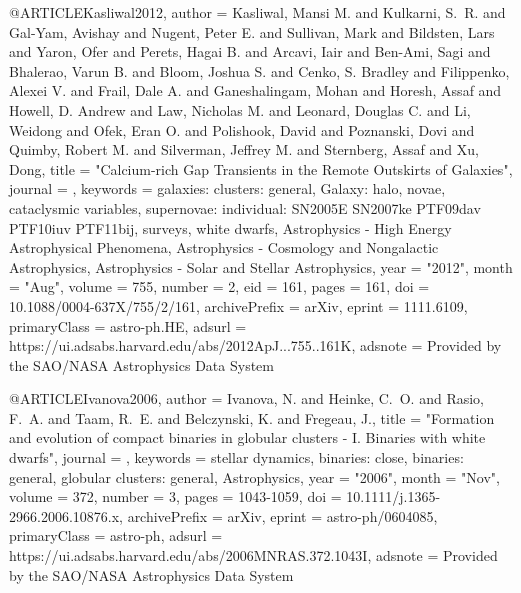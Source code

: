\documentclass[twocolumn,tighten]{aastex63}
\begin{document}
{@ARTICLE{Kasliwal2012,
       author = {{Kasliwal}, Mansi M. and {Kulkarni}, S.~R. and {Gal-Yam}, Avishay and
         {Nugent}, Peter E. and {Sullivan}, Mark and {Bildsten}, Lars and
         {Yaron}, Ofer and {Perets}, Hagai B. and {Arcavi}, Iair and
         {Ben-Ami}, Sagi and {Bhalerao}, Varun B. and {Bloom}, Joshua S. and
         {Cenko}, S. Bradley and {Filippenko}, Alexei V. and {Frail}, Dale A. and
         {Ganeshalingam}, Mohan and {Horesh}, Assaf and {Howell}, D. Andrew and
         {Law}, Nicholas M. and {Leonard}, Douglas C. and {Li}, Weidong and
         {Ofek}, Eran O. and {Polishook}, David and {Poznanski}, Dovi and
         {Quimby}, Robert M. and {Silverman}, Jeffrey M. and {Sternberg}, Assaf and
         {Xu}, Dong},
        title = "{Calcium-rich Gap Transients in the Remote Outskirts of Galaxies}",
      journal = {\apj},
     keywords = {galaxies: clusters: general, Galaxy: halo, novae, cataclysmic variables, supernovae: individual: SN2005E SN2007ke PTF09dav PTF10iuv PTF11bij, surveys, white dwarfs, Astrophysics - High Energy Astrophysical Phenomena, Astrophysics - Cosmology and Nongalactic Astrophysics, Astrophysics - Solar and Stellar Astrophysics},
         year = "2012",
        month = "Aug",
       volume = {755},
       number = {2},
          eid = {161},
        pages = {161},
          doi = {10.1088/0004-637X/755/2/161},
archivePrefix = {arXiv},
       eprint = {1111.6109},
 primaryClass = {astro-ph.HE},
       adsurl = {https://ui.adsabs.harvard.edu/abs/2012ApJ...755..161K},
      adsnote = {Provided by the SAO/NASA Astrophysics Data System}
}

@ARTICLE{Ivanova2006,
       author = {{Ivanova}, N. and {Heinke}, C.~O. and {Rasio}, F.~A. and {Taam}, R.~E. and
         {Belczynski}, K. and {Fregeau}, J.},
        title = "{Formation and evolution of compact binaries in globular clusters - I. Binaries with white dwarfs}",
      journal = {\mnras},
     keywords = {stellar dynamics, binaries: close, binaries: general, globular clusters: general, Astrophysics},
         year = "2006",
        month = "Nov",
       volume = {372},
       number = {3},
        pages = {1043-1059},
          doi = {10.1111/j.1365-2966.2006.10876.x},
archivePrefix = {arXiv},
       eprint = {astro-ph/0604085},
 primaryClass = {astro-ph},
       adsurl = {https://ui.adsabs.harvard.edu/abs/2006MNRAS.372.1043I},
      adsnote = {Provided by the SAO/NASA Astrophysics Data System}
}

}
\end{document}
